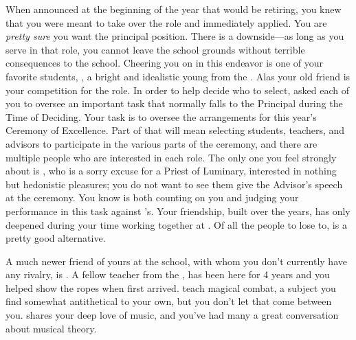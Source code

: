 \documentclass[char]{GL2020}
\begin{document}
When \cPrincipal{} announced at the beginning of the year that \cPrincipal{\they} would be retiring, you knew that you were meant to take over the role and immediately applied. You are \emph{pretty sure} you want the principal position. There is a downside---as long as you serve in that role, you cannot leave the school grounds without terrible consequences to the school. Cheering you on in this endeavor is one of your favorite students, \cDisney{\full}, a bright and idealistic young \cDisney{\person} from the \pFarm{}. Alas your old friend \cBeetle{} is your competition for the role. In order to help \cPrincipal{} decide who to select, \cPrincipal{\they} \cPrincipal{\have} asked each of you to oversee an important task that normally falls to the Principal during the Time of Deciding. Your task is to oversee the arrangements for this year's Ceremony of Excellence. Part of that will mean selecting students, teachers, and advisors to participate in the various parts of the ceremony, and there are multiple people who are interested in each role. The only one you feel strongly about is \cHedonist{}, who is a sorry excuse for a Priest of Luminary, interested in nothing but hedonistic pleasures; you do not want to see them give the Advisor’s speech at the ceremony. You know \cPrincipal{} is both counting on you and judging your performance in this task against \cBeetle{}'s. Your friendship, built over the years, has only deepened during your time working together at \pSchool{}. Of all the people to lose to, \cBeetle{} is a pretty good alternative.

A much newer friend of yours at the school, with whom you don't currently have any rivalry, is \cInterpol{\full}. A fellow teacher from the \pFarm{}, \cInterpol{} has been here for 4 years and you helped show \cInterpol{\them} the ropes when \cInterpol{\they} first arrived. \cInterpol{\They} teach\cInterpol{\pluralC} magical combat, a subject you find somewhat antithetical to your own, but you don't let that come between you. \cInterpol{} shares your deep love of music, and you've had many a great conversation about musical theory.
\end{document}
